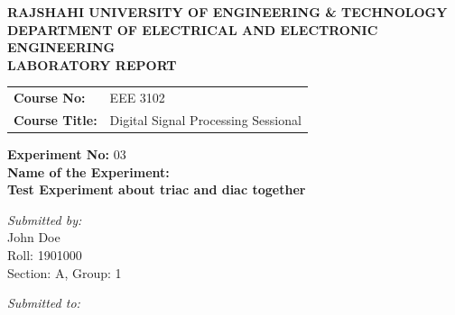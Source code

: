 \documentclass[12pt,a4paper]{article}
\begin{document}
\begin{titlepage}
    \sffamily
    \centering
    \vspace*{1cm}
    
    \Large \textbf{\MakeUppercase{ Rajshahi University of Engineering \& Technology }} \\
    \vspace{0.5cm}
    \large \textbf{\MakeUppercase{ Department of Electrical and Electronic Engineering }} \\
    
    \vspace{2.5cm}
    \Large \textbf{LABORATORY REPORT} \\
    \vspace{1cm}
    
    \begin{tabular}{ll}
        \textbf{Course No:} & EEE 3102 \\
        \textbf{Course Title:} & Digital Signal Processing Sessional \\
    \end{tabular}
    
    \vspace{2cm}
    
    \textbf{Experiment No:} 03 \\
    \vspace{0.5cm}
    \textbf{Name of the Experiment:} \\
    \Large \textbf{ Test Experiment about triac and diac together } \\
    
    \vspace{2.5cm}
    
    \begin{minipage}[t]{0.4\textwidth}
        \begin{flushleft} \large
            \emph{Submitted by:}\\
            John Doe \\
            Roll: 1901000 \\
            Section: A, Group: 1
        \end{flushleft}
    \end{minipage}
    \hfill
    \begin{minipage}[t]{0.5\textwidth}
        \begin{flushright} \large
            \emph{Submitted to:} \\
            

\end{flushright}
\end{minipage}
\end{titlepage}
\end{document}
